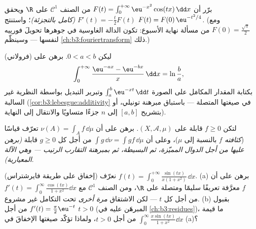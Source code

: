 \begin{exercise}[$\star\star$]\label{exo:b3:lebesgue:7}
برّر أن $F(t) = \int_0^{+\infty}\eu^{-x^2}\cos(tx)\,\dd x$ من الصنف $\mathcal C^1$ على $\R$ ويحقق $F'(t) = -\frac t2F(t)$
\emph{(كامل بالتجزئة)}؛ واستنتج $F(t) =
F(0)\,\eu^{-t^2/4}$. (ومع $F(0) = \frac{\sqrt\pi}2$ من مسألة
نهاية الأسبوع: تكون الدالة الغاوسية في جوهرها تحويلَ فورييه
لنفسها --- وسينظّم \cref{ch:b3:fouriertransform} ذلك.)
\end{exercise}

\begin{exercise}[$\star\star\star$]\label{exo:b3:lebesgue:8}
(فرولاني) ليكن $0 < a < b$. برهن على
\[
\int_0^{+\infty}\frac{\eu^{-ax} - \eu^{-bx}}{x}\,\dd x =
\ln\frac ba,
\]
بكتابة المقدار المكامَل على الصورة $\int_a^b \eu^{-xt}\,\dd t$ وتبرير التبديل
بواسطة النظرية غير السالبة (\cref{cor:b3:lebesgue:additivity} في صيغتها المتصلة ---
باستباق مبرهنة تونيلي، أو بتشريح $[a,b]$ إلى $n$ جزءًا متساويًا
والانتقال إلى النهاية).
\end{exercise}

\begin{exercise}[$\star\star$]\label{exo:b3:lebesgue:9}
لتكن $f \geq 0$ قابلة  على $(X, \mathcal A, \mu)$. برهن على أن $\nu(A) = \int_A f\,\dd\mu$
تعرّف قياسًا (\emph{كثافته} $f$ بالنسبة إلى
$\mu$)، وعلى أن $\int g\,\dd\nu = \int gf\,\dd\mu$ من أجل كل $g \geq 0$ قابلة 
\emph{(برهن عليها من أجل الدوال المميّزة، ثم البسيطة، ثم بمبرهنة
التقارب الرتيب --- وهي الآلة المعيارية)}.
\end{exercise}

\begin{exercise}[$\star\star\star$]\label{exo:b3:lebesgue:10}
(إخفاق على طريقة فايرشتراس) نعرّف $f(t) =
\int_0^{+\infty}\frac{\sin(tx)}{x(1 + x^2)}\,\dd x$.
(a) برهن على أن $f$ معرَّفة تعريفًا سليمًا ومتصلة على $\R$، ومن
الصنف $\mathcal C^1$ مع $f'(t) = \int_0^\infty\frac{\cos(tx)}{1 +
x^2}\dd x$ من أجل كل $t$ --- لكن الاشتقاق
\emph{مرة أخرى} تحت التكامل غير مشروع.
(b) بقبول $f'(t) = \frac\pi2\eu^{-t}$ من أجل $t > 0$ (المبرهَن عليه في \cref{ch:b3:residues})،
ما قيمة $\int_0^\infty\frac{x\sin(tx)}{1+x^2}\dd x$ من أجل $t > 0$، ولماذا تؤكّد صيغتها الإخفاقَ في
(a)؟
\end{exercise}

